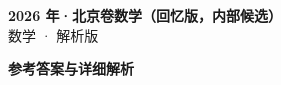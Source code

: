 \documentclass[zihao=-4, a4paper]{ctexart}
\begin{document}
\begin{center}
  {\Large\bfseries 2026 年·北京卷数学（回忆版，内部候选）}\\[4pt]
  {\large 数学 · 解析版}
\end{center}
\medskip
{}

\clearpage
{}
\begin{center}{\Large\bfseries 参考答案与详细解析}\end{center}
\medskip

\end{document}

